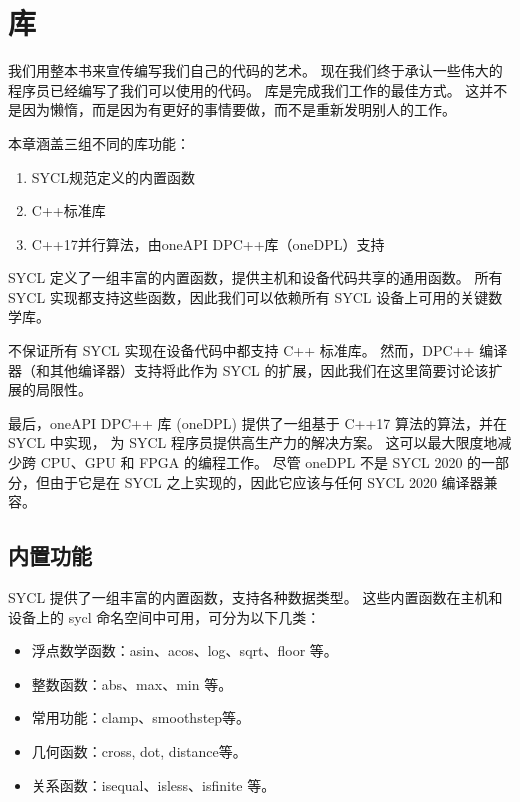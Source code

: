 \section{库}
我们用整本书来宣传编写我们自己的代码的艺术。 现在我们终于承认一些伟大的程序员已经编写了我们可以使用的代码。 
库是完成我们工作的最佳方式。 这并不是因为懒惰，而是因为有更好的事情要做，而不是重新发明别人的工作。

本章涵盖三组不同的库功能：

\begin{enumerate}
	\item SYCL规范定义的内置函数

	\item C++标准库

	\item C++17并行算法，由oneAPI DPC++库（oneDPL）支持
\end{enumerate}

SYCL 定义了一组丰富的内置函数，提供主机和设备代码共享的通用函数。 
所有 SYCL 实现都支持这些函数，因此我们可以依赖所有 SYCL 设备上可用的关键数学库。

不保证所有 SYCL 实现在设备代码中都支持 C++ 标准库。 
然而，DPC++ 编译器（和其他编译器）支持将此作为 SYCL 的扩展，因此我们在这里简要讨论该扩展的局限性。

最后，oneAPI DPC++ 库 (oneDPL) 提供了一组基于 C++17 算法的算法，并在 SYCL 中实现，
为 SYCL 程序员提供高生产力的解决方案。 这可以最大限度地减少跨 CPU、GPU 和 FPGA 的编程工作。 
尽管 oneDPL 不是 SYCL 2020 的一部分，但由于它是在 SYCL 之上实现的，因此它应该与任何 SYCL 2020 编译器兼容。

\subsection{内置功能}
SYCL 提供了一组丰富的内置函数，支持各种数据类型。 这些内置函数在主机和设备上的 sycl 命名空间中可用，可分为以下几类：

\begin{itemize}
	\item 浮点数学函数：asin、acos、log、sqrt、floor 等。

	\item 整数函数：abs、max、min 等。

	\item 常用功能：clamp、smoothstep等。

	\item 几何函数：cross, dot, distance等。

	\item 关系函数：isequal、isless、isfinite 等。
\end{itemize}


